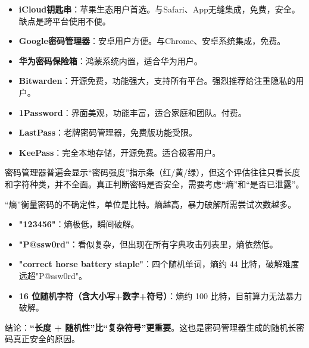 

\begin{itemize}
  \item \textbf{iCloud钥匙串}：苹果生态用户首选。与Safari、App无缝集成，免费，安全。缺点是跨平台使用不便。
  \item \textbf{Google密码管理器}：安卓用户方便。与Chrome、安卓系统集成，免费。
  \item \textbf{华为密码保险箱}：鸿蒙系统内置，适合华为用户。
\end{itemize}


\begin{itemize}
  \item \textbf{Bitwarden}：开源免费，功能强大，支持所有平台。强烈推荐给注重隐私的用户。
  \item \textbf{1Password}：界面美观，功能丰富，适合家庭和团队。付费。
  \item \textbf{LastPass}：老牌密码管理器，免费版功能受限。
  \item \textbf{KeePass}：完全本地存储，开源免费。适合极客用户。
\end{itemize}


密码管理器普遍会显示“密码强度”指示条（红/黄/绿），但这个评估往往只看长度和字符种类，并不全面。真正判断密码是否安全，需要考虑“熵”和“是否已泄露”。


“熵”衡量密码的不确定性，单位是比特。熵越高，暴力破解所需尝试次数越多。

\begin{itemize}
  \item \textbf{"123456"}：熵极低，瞬间破解。
  \item \textbf{"P@ssw0rd"}：看似复杂，但出现在所有字典攻击列表里，熵依然低。
  \item \textbf{"correct horse battery staple"}：四个随机单词，熵约 44 比特，破解难度远超"P@ssw0rd"。
  \item \textbf{16 位随机字符（含大小写+数字+符号）}：熵约 100 比特，目前算力无法暴力破解。
\end{itemize}

结论：\textbf{“长度 + 随机性”比“复杂符号”更重要}。这也是密码管理器生成的随机长密码真正安全的原因。



